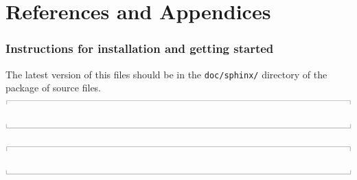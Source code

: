 \documentclass[12pt,a4paper,twoside]{article}
\newcommand{\topbar}{\ensuremath{
    \rule{0.1mm}{2.0mm} \rule[2.0mm]{159.5mm}{0.1mm} \rule{0.1mm}{2.0mm}
}}
\newcommand{\bottombar}{\ensuremath{
    \rule{0.1mm}{2.0mm} \rule{159.5mm}{0.1mm} \rule{0.1mm}{2.0mm}
}}
\begin{document}
\part{References and Appendices}




\cleardoublepage
\appendix

\section{Instructions for installation and getting started}
\label{getting-started-file}
%
The latest version of this files should be in the \texttt{doc/sphinx/} directory 
of the package of source files.\\
\topbar

\bottombar

\noindent
\topbar

\bottombar

\cleardoublepage


\cleardoublepage


\cleardoublepage
\end{document}
